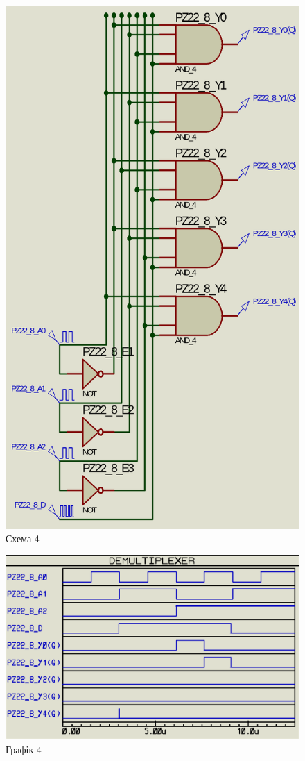 \documentclass{article}
\begin{document}
\begin{normalsize}
	\begin{figure}[H]
		\centering
		\includegraphics[scale=0.34]{s4}	
		\caption{Схема 4}
	\end{figure}
	\begin{figure}[H]
		\centering
		\includegraphics[scale=0.34]{g4}	
		\caption{Графік 4}
	\end{figure}


\end{normalsize}
\end{document}
